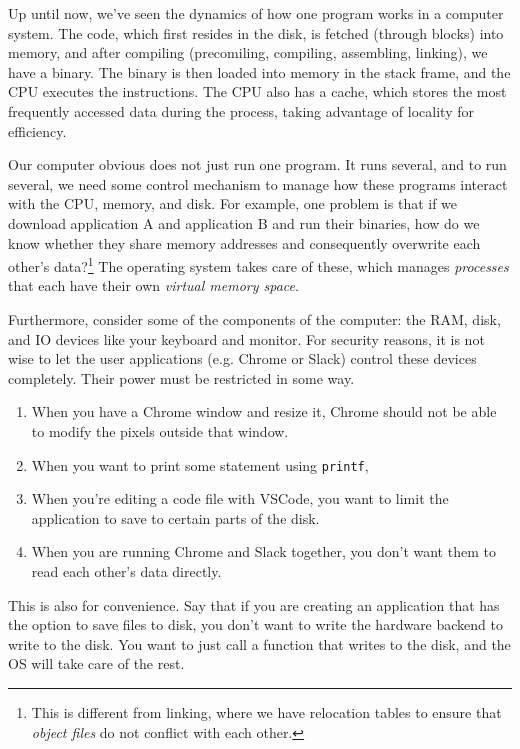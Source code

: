 \documentclass{article}
\begin{document}
    Up until now, we've seen the dynamics of how one program works in a computer system. The code, which first resides in the disk, is fetched (through blocks) into memory, and after compiling (precomiling, compiling, assembling, linking), we have a binary. The binary is then loaded into memory in the stack frame, and the CPU executes the instructions. The CPU also has a cache, which stores the most frequently accessed data during the process, taking advantage of locality for efficiency. 

    Our computer obvious does not just run one program. It runs several, and to run several, we need some control mechanism to manage how these programs interact with the CPU, memory, and disk. For example, one problem is that if we download application A and application B and run their binaries, how do we know whether they share memory addresses and consequently overwrite each other's data?\footnote{This is different from linking, where we have relocation tables to ensure that \textit{object files} do not conflict with each other.} The operating system takes care of these, which manages \textit{processes} that each have their own \textit{virtual memory space}. 

    Furthermore, consider some of the components of the computer: the RAM, disk, and IO devices like your keyboard and monitor. For security reasons, it is not wise to let the user applications (e.g. Chrome or Slack) control these devices completely. Their power must be restricted in some way. 
    \begin{enumerate}
      \item When you have a Chrome window and resize it, Chrome should not be able to modify the pixels outside that window. 
      \item When you want to print some statement using \texttt{printf}, 
      \item When you're editing a code file with VSCode, you want to limit the application to save to certain parts of the disk. 
      \item When you are running Chrome and Slack together, you don't want them to read each other's data directly. 
    \end{enumerate}
    This is also for convenience. Say that if you are creating an application that has the option to save files to disk, you don't want to write the hardware backend to write to the disk. You want to just call a function that writes to the disk, and the OS will take care of the rest. 
\end{document}
